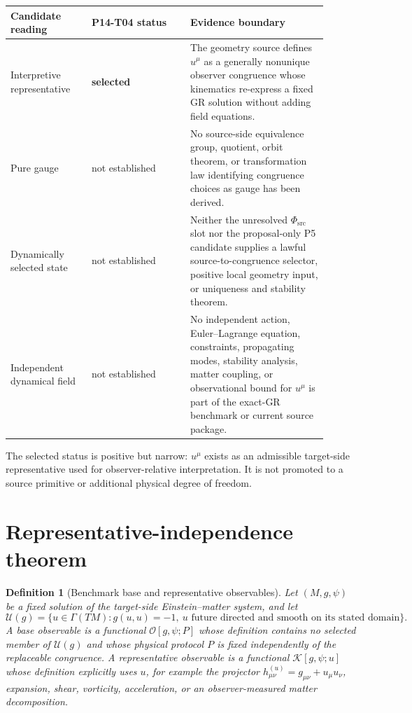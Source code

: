 \documentclass[11pt]{article}
\newtheorem{definition}{Definition}
\newcommand{\PhiSrc}{\Phi_{\mathrm{src}}}
\begin{document}
\begin{longtable}{p{0.23\linewidth}p{0.28\linewidth}p{0.39\linewidth}}
\toprule
Candidate reading & P14-T04 status & Evidence boundary \\
\midrule
\endhead
Interpretive representative & \textbf{selected} & The geometry source defines
$u^\mu$ as a generally nonunique observer congruence whose kinematics
re-express a fixed GR solution without adding field equations. \\
Pure gauge & not established & No source-side equivalence group, quotient,
orbit theorem, or transformation law identifying congruence choices as gauge
has been derived. \\
Dynamically selected state & not established & Neither the unresolved
$\PhiSrc$ slot nor the proposal-only P5 candidate supplies a lawful
source-to-congruence selector, positive local geometry input, or uniqueness
and stability theorem. \\
Independent dynamical field & not established & No independent action,
Euler--Lagrange equation, constraints, propagating modes, stability analysis,
matter coupling, or observational bound for $u^\mu$ is part of the exact-GR
benchmark or current source package. \\
\bottomrule
\end{longtable}

The selected status is positive but narrow: $u^\mu$ exists as an admissible
target-side representative used for observer-relative interpretation.  It is
not promoted to a source primitive or additional physical degree of freedom.

\section{Representative-independence theorem}

\begin{definition}[Benchmark base and representative observables]
Let $(M,g,\psi)$ be a fixed solution of the target-side Einstein--matter
system, and let
\[
  \mathcal U(g)=\{u\in\Gamma(TM):g(u,u)=-1,\ u\text{ future directed and
  smooth on its stated domain}\}.
\]
A \emph{base observable} is a functional $\mathcal O[g,\psi;P]$ whose
definition contains no selected member of $\mathcal U(g)$ and whose physical
protocol $P$ is fixed independently of the replaceable congruence.  A
\emph{representative observable} is a functional
$\mathcal K[g,\psi;u]$ whose definition explicitly uses $u$, for example the
projector $h^{(u)}_{\mu\nu}=g_{\mu\nu}+u_\mu u_\nu$, expansion, shear,
vorticity, acceleration, or an observer-measured matter decomposition.
\end{definition}
\end{document}
